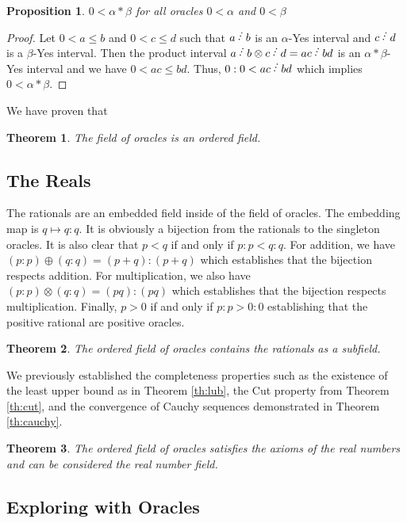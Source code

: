 \documentclass[12pt]{article}
\newtheorem{theorem}{Theorem}[subsection]
\newtheorem{proposition}{Proposition}[subsection]
\begin{document}
\begin{proposition}
$0 < \alpha*\beta$ for all oracles $0 < \alpha$ and $0< \beta$ 
\end{proposition}

\begin{proof}
Let $0 < a \leq b$ and $0<c \leq d$ such that $a\lte b$ is an $\alpha$-Yes interval and $c\lte d$ is a $\beta$-Yes interval. Then the product interval $a \lte b \otimes c \lte d = ac \lte bd$ is an $\alpha*\beta$-Yes interval and we have $0 < ac \leq bd$. Thus, $0:0 < ac \lte bd$ which implies $0 < \alpha*\beta$. 
\end{proof}

We have proven that

\begin{theorem}
The field of oracles is an ordered field.
\end{theorem}

\subsection{The Reals}

The rationals are an embedded field inside of the field of oracles. The embedding map is $q \mapsto q:q$. It is obviously a bijection from the rationals to the singleton oracles. It is also clear that $p<q$ if and only if $p:p < q:q$. For addition, we have $(p:p) \oplus (q:q) = (p+q):(p+q)$ which establishes that the bijection respects addition. For multiplication, we also have $(p:p) \otimes (q:q) = (pq):(pq)$ which establishes that the bijection respects multiplication.  Finally, $p>0$ if and only if $p:p > 0:0$ establishing that the positive rational are positive oracles. 

\begin{theorem}
The ordered field of oracles contains the rationals as a subfield. 
\end{theorem}

We previously established the completeness properties such as the existence of the least upper bound as in Theorem \ref{th:lub}, the Cut property from Theorem \ref{th:cut}, and the convergence of Cauchy sequences demonstrated in Theorem \ref{th:cauchy}.

\begin{theorem}
The ordered field of oracles satisfies the axioms of the real numbers and can be considered the real number field. 
\end{theorem}

\subsection{Exploring with Oracles}
\end{document}
